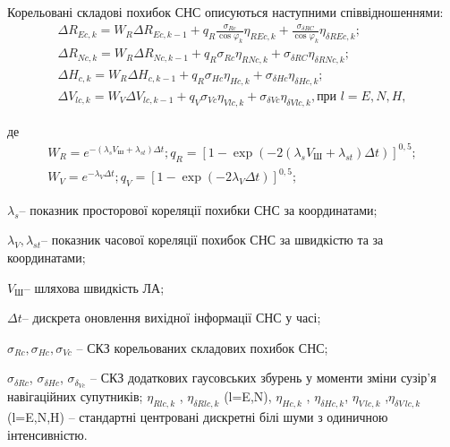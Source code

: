 Корельовані складові похибок СНС описуються наступними співвідношеннями:
\begin{equation}\label{eq:sns_errors_cor} 
\begin{array}{l} 
{\Delta R_{Ec,k}=W_{R} \Delta R_{Ec,k-1} +q_{R} \frac{\sigma_{Rc} }{\cos \varphi_{k} } \eta_{REc,k} +\frac{\sigma_{\delta RC} }{\cos \varphi_{k} } \eta_{\delta REc,k} ;} \\ 
{\Delta R_{Nc,k}=W_{R} \Delta R_{Nc,k-1} +q_{R} \sigma_{Rc} \eta_{RNc,k} +\sigma_{\delta RC} \eta_{\delta RNc,k} ;} \\ 
{\Delta H_{c,k}=W_{R}  \Delta H_{c,k-1}  +q_{R} \sigma_{Hc} \eta_{Hc,k} +\sigma_{\delta Hc} \eta_{\delta Hc,k} ;} \\ 
{\Delta V_{lc,k} =W_{V} \Delta V_{lc,k-1} +q_{V}\sigma_{Vc} \eta_{V lc,k} +\sigma_{\delta Vc} \eta_{\delta V lc,k}, \text{при } l=E,N,H,} 
\end{array} \end{equation} 
\begin{ESKDexplanation}
\item де  
\[
\begin{array}{l}
{W_{R} =e^{-(\lambda_{s} V_{\text{Ш}} +\lambda_{st} )\Delta t} ; }
{q_{R} =\left[1-\exp \left(-2\left(\lambda_{s} V_{\text{Ш}} +\lambda_{st} \right)\Delta t\right)\right]^{0,5};}\\
{W_{V} =e^{-\lambda_{V} \Delta t};}
{q_{V} =\left[1-\exp \left(-2 \lambda_{V} \Delta t\right)\right]^{0,5};}
\end{array}\] 
\item $\lambda_{s} $-- показник просторової кореляції похибки СНС за координатами; 
\item $\lambda_{V} ,\lambda_{st} $-- показник часової кореляції похибок СНС за швидкістю та за 
координатами; 
\item $V_{\text{Ш}}$-- шляхова швидкість ЛА;
\item $\Delta t$-- дискрета оновлення вихідної інформації СНС у часі;
\item $\sigma_{Rc} ,\sigma_{Hc} ,\sigma_{Vc} $ -- СКЗ корельованих складових похибок СНС;
\item $\sigma_{\delta Rc} $,  $\sigma_{\delta Hc} $, $\sigma_{\delta_{Vc}} $  -- СКЗ 
додаткових гаусовських збурень у моменти зміни сузір'я навігаційних супутників;
$\eta_{Rlc,k}$ ,  $\eta_{\delta Rlc,k}$  (l=E,N),  $\eta_{Hc,k}$ 
, $\eta_{\delta Hc,k}$, $\eta_{V\, lc,k}$ ,$\eta_{\delta V\, lc,k}$ (l=E,N,H) -- 
стандартні центровані дискретні білі шуми з одиничною інтенсивністю.
\end{ESKDexplanation}

